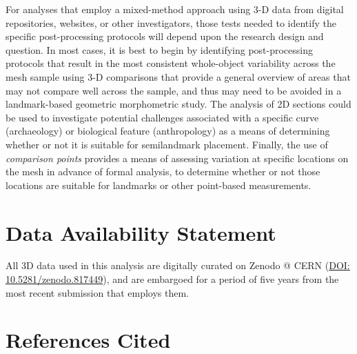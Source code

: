 \documentclass[review]{elsarticle}
\begin{document}
For analyses that employ a mixed-method approach using 3-D data from digital repositories, websites, or other investigators, those tests needed to identify the specific post-processing protocols will depend upon the research design and question. In most cases, it is best to begin by identifying post-processing protocols that result in the most consistent whole-object variability across the mesh sample using 3-D comparisons that provide a general overview of areas that may not compare well across the sample, and thus may need to be avoided in a landmark-based geometric morphometric study. The analysis of 2D sections could be used to investigate potential challenges associated with a specific curve (archaeology) or biological feature (anthropology) as a means of determining whether or not it is suitable for semilandmark placement. Finally, the use of \textit{comparison points} provides a means of assessing variation at specific locations on the mesh in advance of formal analysis, to determine whether or not those locations are suitable for landmarks or other point-based measurements.

\section*{Data Availability Statement}

All 3D data used in this analysis are digitally curated on Zenodo @ CERN (\href{https://zenodo.org/record/817449}{DOI: 10.5281/zenodo.817449}), and are embargoed for a period of five years from the most recent submission that employs them.

\section*{References Cited}


\end{document}
